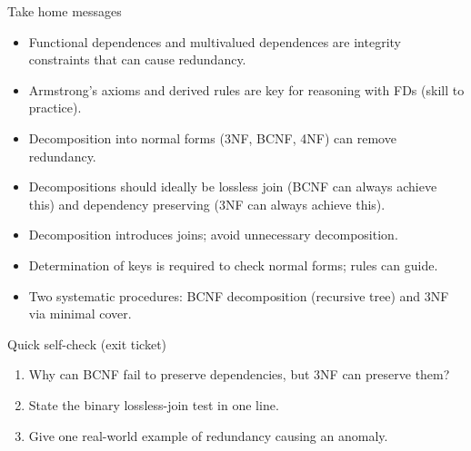 \documentclass[10pt,aspectratio=169]{beamer}
\begin{document}
\begin{frame}{Take home messages}
\begin{itemize}
  \item Functional dependences and multivalued dependences are integrity constraints that can cause redundancy.
  \item Armstrong’s axioms and derived rules are key for reasoning with FDs (skill to practice).
  \item Decomposition into normal forms (3NF, BCNF, 4NF) can remove redundancy.
  \item Decompositions should ideally be lossless join (BCNF can always achieve this) and dependency preserving (3NF can always achieve this).
  \item Decomposition introduces joins; avoid unnecessary decomposition.
  \item Determination of keys is required to check normal forms; rules can guide.
  \item Two systematic procedures: BCNF decomposition (recursive tree) and 3NF via minimal cover.
\end{itemize}
\end{frame}

\begin{frame}{Quick self-check (exit ticket)}
\begin{enumerate}
  \item Why can BCNF fail to preserve dependencies, but 3NF can preserve them?
  \item State the binary lossless-join test in one line.
  \item Give one real-world example of redundancy causing an anomaly.
\end{enumerate}
\end{frame}
\end{document}
